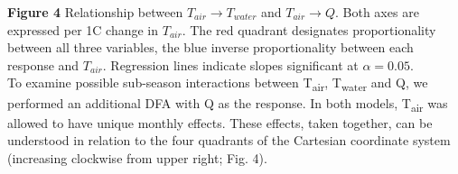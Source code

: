 \documentclass[notitlepage]{article}
\begin{document}
\begin{center}
\end{center}
\textbf{Figure 4} Relationship between $T_{air}\rightarrow T_{water}$ and $T_{air}\rightarrow Q$. Both axes are expressed per 1\degree C change in $T_{air}$. The red quadrant designates proportionality between all three variables, the blue inverse proportionality between each response and $T_{air}$. Regression lines indicate slopes significant at $\alpha=0.05$.
\\[\baselineskip]

To examine possible sub-season interactions between T\textsubscript{air}, T\textsubscript{water} and Q, we performed an additional DFA with Q as the response. In both models, T\textsubscript{air} was allowed to have unique monthly effects. These effects, taken together, can be understood in relation to the four quadrants of the Cartesian coordinate system (increasing clockwise from upper right; Fig. 4).
\end{document}
